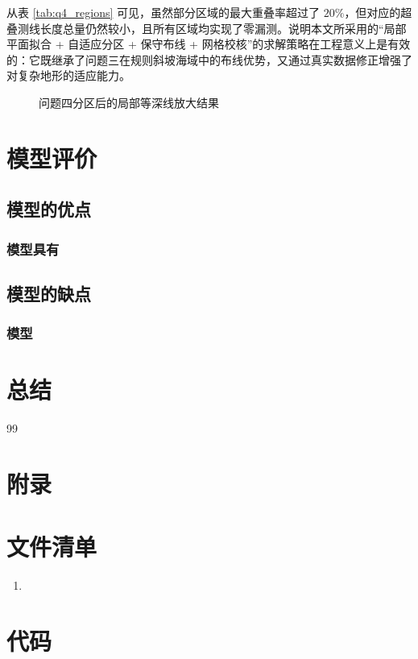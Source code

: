 \documentclass[UTF-8,a4paper,zihao=-4]{ctexart}
\begin{document}
从表 \ref{tab:q4_regions} 可见，虽然部分区域的最大重叠率超过了 $20\%$，但对应的超叠测线长度总量仍然较小，且所有区域均实现了零漏测。说明本文所采用的“局部平面拟合 + 自适应分区 + 保守布线 + 网格校核”的求解策略在工程意义上是有效的：它既继承了问题三在规则斜坡海域中的布线优势，又通过真实数据修正增强了对复杂地形的适应能力。

\begin{figure}[htbp]
\centering
\caption{问题四分区后的局部等深线放大结果}
\label{fig:q4_local_regions}
\end{figure}

\section{模型评价}
\subsection{模型的优点}
\subsubsection{模型具有}

\subsection{模型的缺点}
\subsubsection{模型}


\section{总结}

\begin{thebibliography}{99}   %

\end{thebibliography}

\section*{附录}
\appendix

\section{文件清单}


\begin{enumerate}
    \item
\end{enumerate}

\section{代码}


\end{document}

